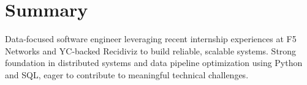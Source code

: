 \section{Summary}
    Data-focused software engineer leveraging recent internship experiences at F5 Networks and YC-backed Recidiviz to build reliable, scalable systems. Strong foundation in distributed systems and data pipeline optimization using Python and SQL, eager to contribute to meaningful technical challenges.

